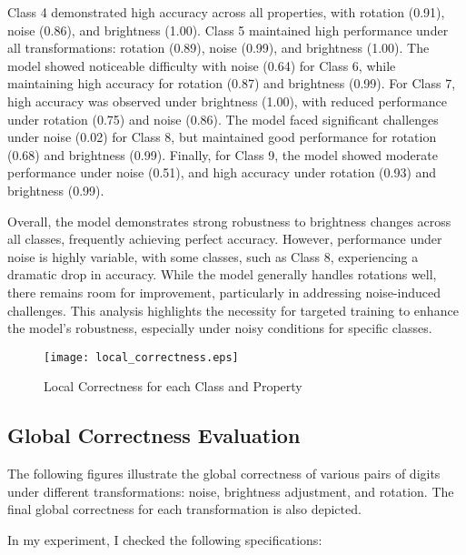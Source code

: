 Class 4 demonstrated high accuracy across all properties, with rotation (0.91), noise (0.86), and brightness (1.00). Class 5 maintained high performance under all transformations: rotation (0.89), noise (0.99), and brightness (1.00). The model showed noticeable difficulty with noise (0.64) for Class 6, while maintaining high accuracy for rotation (0.87) and brightness (0.99). For Class 7, high accuracy was observed under brightness (1.00), with reduced performance under rotation (0.75) and noise (0.86). The model faced significant challenges under noise (0.02) for Class 8, but maintained good performance for rotation (0.68) and brightness (0.99). Finally, for Class 9, the model showed moderate performance under noise (0.51), and high accuracy under rotation (0.93) and brightness (0.99).

Overall, the model demonstrates strong robustness to brightness changes across all classes, frequently achieving perfect accuracy. However, performance under noise is highly variable, with some classes, such as Class 8, experiencing a dramatic drop in accuracy. While the model generally handles rotations well, there remains room for improvement, particularly in addressing noise-induced challenges. This analysis highlights the necessity for targeted training to enhance the model's robustness, especially under noisy conditions for specific classes.

\begin{figure}[h]
    \centering
    \texttt{[image: local\_correctness.eps]}
    \caption{Local Correctness for each Class and Property}
    \label{fig:local_correctness}
\end{figure}
\subsection{Global Correctness Evaluation}
The following figures illustrate the global correctness of various pairs of digits under different transformations: noise, brightness adjustment, and rotation. The final global correctness for each transformation is also depicted.

In my experiment, I checked the following specifications:

  


